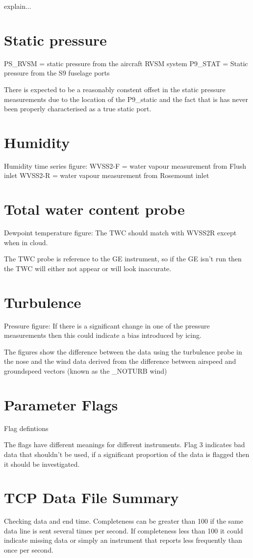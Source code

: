 explain...

\section*{Static pressure}
PS_RVSM = static pressure from the aircraft RVSM system
P9_STAT = Static pressure from the S9 fuselage ports 

There is expected to be a reasonably constent offset in the static pressure measurements due to the location of the P9_static and the fact that is has never been properly characterised as a true static port.

\section*{Humidity}
Humidity time series figure:
WVSS2-F = water vapour measurement from Flush inlet
WVSS2-R = water vapour measurement from Rosemount inlet

\section*{Total water content probe}
Dewpoint temperature figure:
The TWC should match with WVSS2R except when in cloud. 

The TWC probe is reference to the GE instrument, so if the GE isn't run then the TWC will either not appear or will look inaccurate. 

\section*{Turbulence}
Pressure figure:
If there is a significant change in one of the pressure measurements then this could indicate a bias introduced by icing. 

The figures show the difference between the data using the turbulence probe in the nose and the wind data derived from the difference between airspeed and groundspeed vectors (known as the _NOTURB wind)


\section*{Parameter Flags}
Flag defintions

The flags have different meanings for different instruments. Flag 3 indicates bad data that shouldn't be used, if a significant proportion of the data is flagged then it should be investigated. 

\section*{TCP Data File Summary}
Checking data and end time. Completeness can be greater than 100 if the same data line is sent several times per second. If completeness less than 100 it could indicate missing data or simply an instrument that reports
less frequently than once per second. 

